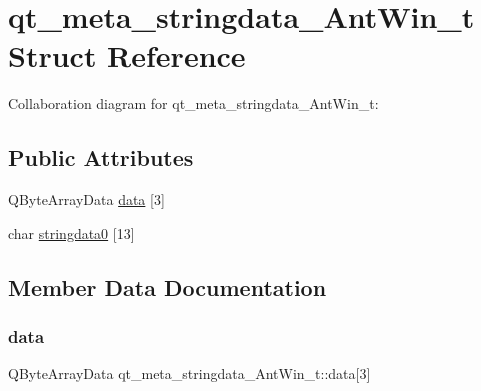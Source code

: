 \hypertarget{structqt__meta__stringdata__AntWin__t}{}\section{qt\+\_\+meta\+\_\+stringdata\+\_\+\+Ant\+Win\+\_\+t Struct Reference}
\label{structqt__meta__stringdata__AntWin__t}


Collaboration diagram for qt\+\_\+meta\+\_\+stringdata\+\_\+\+Ant\+Win\+\_\+t\+:
\subsection*{Public Attributes}
\begin{DoxyCompactItemize}
\item 
Q\+Byte\+Array\+Data \hyperlink{structqt__meta__stringdata__AntWin__t_a4098dbeb24070b1d2bc29f2d272840c3}{data} \mbox{[}3\mbox{]}
\item 
char \hyperlink{structqt__meta__stringdata__AntWin__t_afabb9036fe6ec65beb61ea61058c43fe}{stringdata0} \mbox{[}13\mbox{]}
\end{DoxyCompactItemize}


\subsection{Member Data Documentation}
\mbox{\label{structqt__meta__stringdata__AntWin__t_a4098dbeb24070b1d2bc29f2d272840c3}} 
\subsubsection{\texorpdfstring{data}{data}}
{\footnotesize\ttfamily Q\+Byte\+Array\+Data qt\+\_\+meta\+\_\+stringdata\+\_\+\+Ant\+Win\+\_\+t\+::data\mbox{[}3\mbox{]}}

\mbox{\label{structqt__meta__stringdata__AntWin__t_afabb9036fe6ec65beb61ea61058c43fe}} 
